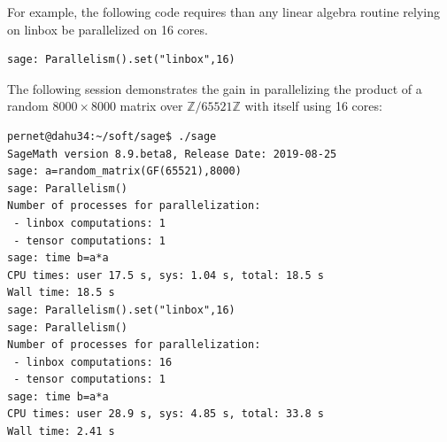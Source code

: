 \documentclass{deliverablereport}
\begin{document}
For example, the following code requires than any linear algebra routine relying on linbox be parallelized on 16 cores.

\begin{lstlisting}
sage: Parallelism().set("linbox",16)
\end{lstlisting}

The following session demonstrates the gain in parallelizing the product of a random $8000\times 8000$ matrix over
$\mathbb{Z}/65521\mathbb{Z}$ with itself using 16 cores:
\begin{lstlisting}
pernet@dahu34:~/soft/sage$ ./sage 
SageMath version 8.9.beta8, Release Date: 2019-08-25
sage: a=random_matrix(GF(65521),8000)
sage: Parallelism()
Number of processes for parallelization:
 - linbox computations: 1
 - tensor computations: 1
sage: time b=a*a
CPU times: user 17.5 s, sys: 1.04 s, total: 18.5 s
Wall time: 18.5 s
sage: Parallelism().set("linbox",16)
sage: Parallelism()
Number of processes for parallelization:
 - linbox computations: 16
 - tensor computations: 1
sage: time b=a*a
CPU times: user 28.9 s, sys: 4.85 s, total: 33.8 s
Wall time: 2.41 s
\end{lstlisting}
\end{document}
